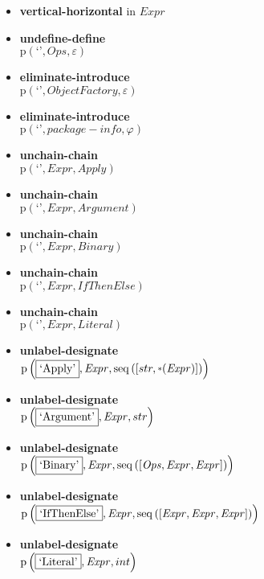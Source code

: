 {\begin{itemize}
\item \textbf{vertical-horizontal}  in $\mathit{Expr}$
\item \textbf{undefine-define}\\$\mathrm{p}\left(\text{`'},\mathit{Ops},\varepsilon\right)$
\item \textbf{eliminate-introduce}\\$\mathrm{p}\left(\text{`'},\mathit{ObjectFactory},\varepsilon\right)$
\item \textbf{eliminate-introduce}\\$\mathrm{p}\left(\text{`'},\mathit{package-info},\varphi\right)$
\item \textbf{unchain-chain}\\$\mathrm{p}\left(\text{`'},\mathit{Expr},\mathit{Apply}\right)$
\item \textbf{unchain-chain}\\$\mathrm{p}\left(\text{`'},\mathit{Expr},\mathit{Argument}\right)$
\item \textbf{unchain-chain}\\$\mathrm{p}\left(\text{`'},\mathit{Expr},\mathit{Binary}\right)$
\item \textbf{unchain-chain}\\$\mathrm{p}\left(\text{`'},\mathit{Expr},\mathit{IfThenElse}\right)$
\item \textbf{unchain-chain}\\$\mathrm{p}\left(\text{`'},\mathit{Expr},\mathit{Literal}\right)$
\item \textbf{unlabel-designate}\\$\mathrm{p}\left(\fbox{\text{`Apply'}},\mathit{Expr},\mathrm{seq}\left(\left[str, \star \left(\mathit{Expr}\right)\right]\right)\right)$
\item \textbf{unlabel-designate}\\$\mathrm{p}\left(\fbox{\text{`Argument'}},\mathit{Expr},str\right)$
\item \textbf{unlabel-designate}\\$\mathrm{p}\left(\fbox{\text{`Binary'}},\mathit{Expr},\mathrm{seq}\left(\left[\mathit{Ops}, \mathit{Expr}, \mathit{Expr}\right]\right)\right)$
\item \textbf{unlabel-designate}\\$\mathrm{p}\left(\fbox{\text{`IfThenElse'}},\mathit{Expr},\mathrm{seq}\left(\left[\mathit{Expr}, \mathit{Expr}, \mathit{Expr}\right]\right)\right)$
\item \textbf{unlabel-designate}\\$\mathrm{p}\left(\fbox{\text{`Literal'}},\mathit{Expr},int\right)$

\end{itemize}}
